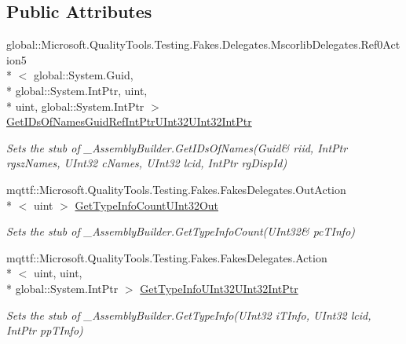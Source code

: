 \subsection*{Public Attributes}
\begin{DoxyCompactItemize}
\item 
global\-::\-Microsoft.\-Quality\-Tools.\-Testing.\-Fakes.\-Delegates.\-Mscorlib\-Delegates.\-Ref0\-Action5\\*
$<$ global\-::\-System.\-Guid, \\*
global\-::\-System.\-Int\-Ptr, uint, \\*
uint, global\-::\-System.\-Int\-Ptr $>$ \hyperlink{class_system_1_1_runtime_1_1_interop_services_1_1_fakes_1_1_stub___assembly_builder_a1073419f78a9dd262929f05258ac90f8}{Get\-I\-Ds\-Of\-Names\-Guid\-Ref\-Int\-Ptr\-U\-Int32\-U\-Int32\-Int\-Ptr}
\begin{DoxyCompactList}\small\item\em Sets the stub of \-\_\-\-Assembly\-Builder.\-Get\-I\-Ds\-Of\-Names(Guid\& riid, Int\-Ptr rgsz\-Names, U\-Int32 c\-Names, U\-Int32 lcid, Int\-Ptr rg\-Disp\-Id)\end{DoxyCompactList}\item 
mqttf\-::\-Microsoft.\-Quality\-Tools.\-Testing.\-Fakes.\-Fakes\-Delegates.\-Out\-Action\\*
$<$ uint $>$ \hyperlink{class_system_1_1_runtime_1_1_interop_services_1_1_fakes_1_1_stub___assembly_builder_a22f2201b55a6db6caff5ab11895c9b0a}{Get\-Type\-Info\-Count\-U\-Int32\-Out}
\begin{DoxyCompactList}\small\item\em Sets the stub of \-\_\-\-Assembly\-Builder.\-Get\-Type\-Info\-Count(U\-Int32\& pc\-T\-Info)\end{DoxyCompactList}\item 
mqttf\-::\-Microsoft.\-Quality\-Tools.\-Testing.\-Fakes.\-Fakes\-Delegates.\-Action\\*
$<$ uint, uint, \\*
global\-::\-System.\-Int\-Ptr $>$ \hyperlink{class_system_1_1_runtime_1_1_interop_services_1_1_fakes_1_1_stub___assembly_builder_a9d8eefcf828442b7e9ccdfca0bbd5e4d}{Get\-Type\-Info\-U\-Int32\-U\-Int32\-Int\-Ptr}
\begin{DoxyCompactList}\small\item\em Sets the stub of \-\_\-\-Assembly\-Builder.\-Get\-Type\-Info(\-U\-Int32 i\-T\-Info, U\-Int32 lcid, Int\-Ptr pp\-T\-Info)\end{DoxyCompactList}\item 

\end{DoxyCompactItemize}
